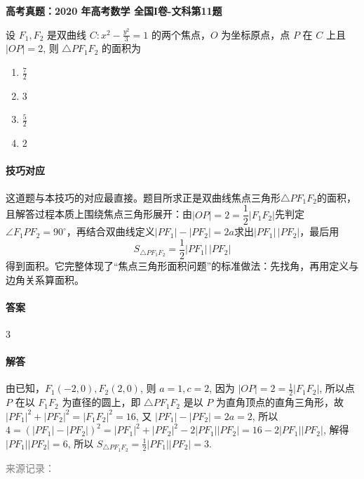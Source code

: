 \documentclass[UTF8,a4paper,11pt]{ctexart}
\newenvironment{gaokao}[1]{\par\medskip\noindent\textbf{高考真题：#1}\par\smallskip}{\par\medskip}
\begin{document}
\begin{gaokao}{2020 年高考数学 全国I卷-文科第11题}

设 $F_1, F_2$ 是双曲线 $C: x^2 - \frac{y^2}{3} = 1$ 的两个焦点，$O$ 为坐标原点，点 $P$ 在 $C$ 上且 $|OP| = 2$, 则 $\triangle PF_1F_2$ 的面积为

\begin{enumerate}[label=\Alph*. ,itemsep=2pt]

\item $\frac{7}{2}$

\item $3$

\item $\frac{5}{2}$

\item $2$

\end{enumerate}

\paragraph{技巧对应}

这道题与本技巧的对应最直接。题目所求正是双曲线焦点三角形$\triangle PF_1F_2$的面积，且解答过程本质上围绕焦点三角形展开：由$|OP|=2=\dfrac12|F_1F_2|$先判定$\angle F_1PF_2=90^\circ$，再结合双曲线定义$|PF_1|-|PF_2|=2a$求出$|PF_1|\,|PF_2|$，最后用
\[
S_{\triangle PF_1F_2}=\frac12|PF_1|\,|PF_2|
\]
得到面积。它完整体现了“焦点三角形面积问题”的标准做法：先找角，再用定义与边角关系算面积。

\paragraph{答案}

$3$

\paragraph{解答}

由已知，$F_1(-2,0), F_2(2,0)$, 则 $a=1, c=2$, 因为 $|OP|=2 = \frac{1}{2}|F_1F_2|$, 所以点 $P$ 在以 $F_1F_2$ 为直径的圆上，即 $\triangle PF_1F_2$ 是以 $P$ 为直角顶点的直角三角形，故 $|PF_1|^2 + |PF_2|^2 = |F_1F_2|^2 = 16$, 又 $|PF_1|-|PF_2|=2a=2$, 所以 $4 = (|PF_1|-|PF_2|)^2 = |PF_1|^2 + |PF_2|^2 - 2|PF_1||PF_2| = 16 - 2|PF_1||PF_2|$, 解得 $|PF_1||PF_2|=6$, 所以 $S_{\triangle PF_1F_2} = \frac{1}{2}|PF_1||PF_2|=3$.

\par\smallskip\textcolor{gray}{\footnotesize 来源记录：\texttt{}}

\end{gaokao}
\end{document}
